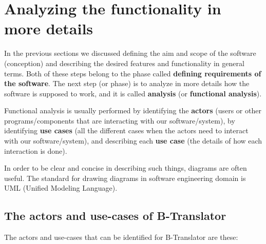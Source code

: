 \documentclass[11pt]{article}
\begin{document}
\section{Analyzing the functionality in more details}
\label{sec-4}


  In the previous sections we discussed defining the aim and scope of
  the software (conception) and describing the desired features and
  functionality in general terms. Both of these steps belong to the
  phase called \textbf{defining requirements of the software}. The next step
  (or phase) is to analyze in more details how the software is
  supposed to work, and it is called \textbf{analysis} (or \textbf{functional   analysis}).

  Functional analysis is usually performed by identifying the \textbf{actors}
  (users or other programs/components that are interacting with our
  software/system), by identifying \textbf{use cases} (all the different
  cases when the actors need to interact with our software/system),
  and describing each \textbf{use case} (the details of how each interaction
  is done).

  In order to be clear and concise in describing such things, diagrams
  are often useful. The standard for drawing diagrams in software
  engineering domain is UML (Unified Modeling Language).

\subsection{The actors and use-cases of B-Translator}
\label{sec-4.1}


   The actors and use-cases that can be identified for B-Translator
   are these:
\end{document}
